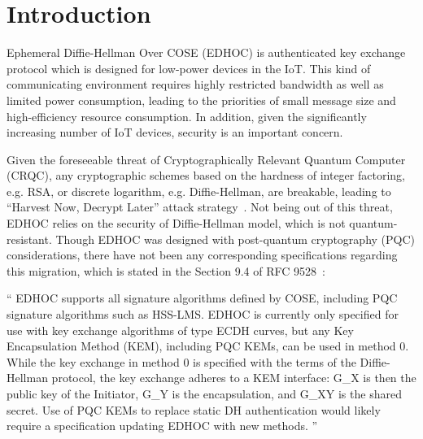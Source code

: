 \section{Introduction}
Ephemeral Diffie-Hellman Over COSE (EDHOC) is authenticated key exchange protocol
which is designed for low-power devices in the IoT. This kind of communicating
environment requires highly restricted bandwidth as well as limited power consumption,
leading to the priorities of small message size and high-efficiency resource consumption.
In addition, given the significantly increasing number of IoT devices, security is
an important concern.

Given the foreseeable threat of Cryptographically Relevant Quantum Computer (CRQC), any
cryptographic schemes based on the hardness of integer factoring, e.g. RSA, or
discrete logarithm, e.g. Diffie-Hellman, are breakable, leading to ``Harvest Now, Decrypt Later''
attack strategy~\cite{crqc,eu-quantum-migration}. Not being out of this threat, EDHOC relies on the security of Diffie-Hellman
model, which is not quantum-resistant. Though
EDHOC was designed with post-quantum cryptography (PQC) considerations, there have not been any corresponding
specifications regarding this migration, which is stated in the Section 9.4 of RFC 9528~\cite{edhoc-rfc}:
\begin{displayquote}
    ``
    EDHOC supports all signature algorithms defined by COSE, including PQC signature algorithms such as HSS-LMS\@.
    EDHOC is currently only specified for use with key exchange algorithms of type ECDH curves, but any Key
    Encapsulation Method (KEM), including PQC KEMs, can be used in method 0. While the key exchange in method 0
    is specified with the terms of the Diffie-Hellman protocol, the key exchange adheres to a KEM interface:
    G\_X is then the public key of the Initiator, G\_Y is the encapsulation, and G\_XY is the shared secret.
    Use of PQC KEMs to replace static DH authentication would likely require a specification updating EDHOC
    with new methods.
    ''
\end{displayquote}

